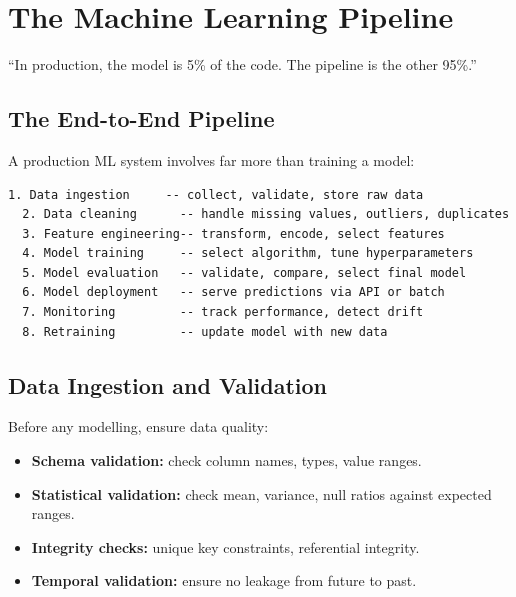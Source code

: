 \chapter{The Machine Learning Pipeline}
\label{ch:pipeline}

\epigraph{``In production, the model is 5\% of the code. The pipeline is the other 95\%.''}{}


\section{The End-to-End Pipeline}

A production ML system involves far more than training a model:

\begin{lstlisting}[caption=The ML pipeline stages]
  1. Data ingestion     -- collect, validate, store raw data
  2. Data cleaning      -- handle missing values, outliers, duplicates
  3. Feature engineering-- transform, encode, select features
  4. Model training     -- select algorithm, tune hyperparameters
  5. Model evaluation   -- validate, compare, select final model
  6. Model deployment   -- serve predictions via API or batch
  7. Monitoring         -- track performance, detect drift
  8. Retraining         -- update model with new data
\end{lstlisting}

\section{Data Ingestion and Validation}

Before any modelling, ensure data quality:

\begin{itemize}
	\item \textbf{Schema validation:} check column names, types, value ranges.
	\item \textbf{Statistical validation:} check mean, variance, null ratios against expected ranges.
	\item \textbf{Integrity checks:} unique key constraints, referential integrity.
	\item \textbf{Temporal validation:} ensure no leakage from future to past.
\end{itemize}


